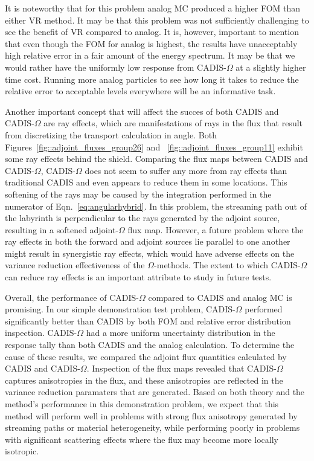 \documentclass[12pt]{article}
\begin{document}
It is noteworthy that for this problem analog MC produced a higher FOM than either VR method. 
It may be that this problem was not sufficiently challenging to see the benefit of VR compared to analog. 
It is, however, important to mention that even though the FOM for analog is highest, the results have unacceptably high relative error in a fair amount of the energy spectrum. 
It may be that we would rather have the uniformly low response from CADIS-$\Omega$ at a slightly higher time cost.
Running more analog particles to see how long it takes to reduce the relative error to acceptable levels everywhere will be an informative task. 

Another important concept that will affect the succes of both CADIS and CADIS-$\Omega$ are ray effects, which are manifestations of rays in the flux that result from discretizing the transport calculation in angle. Both Figures~\ref{fig::adjoint_fluxes_group26} and ~\ref{fig::adjoint_fluxes_group11} exhibit some ray effects behind the shield. Comparing the flux maps between CADIS and  CADIS-$\Omega$, CADIS-$\Omega$ does not seem to suffer any more from ray effects than traditional CADIS and even appears to reduce them in some locations. This softening of the rays may be caused by the integration performed in the numerator of Eqn.~\eqref{eq:angularhybrid}. In this problem, the streaming path out of the labyrinth is perpendicular to the rays generated by the adjoint source, resulting in a softened adjoint-$\Omega$ flux map. However, a future problem where the ray effects in both the forward and adjoint sources lie parallel to one another might result in synergistic ray effects, which would have adverse effects on the variance reduction effectiveness of the $\Omega$-methods. The extent to which CADIS-$\Omega$ can reduce ray effects is an important attribute to study in future tests.

Overall, the performance of CADIS-$\Omega$ compared to CADIS and analog MC is promising. In our simple demonstration test problem, CADIS-$\Omega$ performed significantly better than CADIS by both FOM and relative error distribution inspection. CADIS-$\Omega$ had a more uniform uncertainty distribution in the response tally than both CADIS and the analog calculation. To determine the cause of these results, we compared the adjoint flux quantities calculated by CADIS and CADIS-$\Omega$. Inspection of the flux maps revealed that CADIS-$\Omega$ captures anisotropies in the flux, and these anisotropies are reflected in the variance reduction paramaters that are generated. Based on both theory and the method's performance in this demonstration problem, we expect that this method will perform well in problems with strong flux anisotropy generated by streaming paths or material heterogeneity, while performing poorly in problems with significant scattering effects where the flux may become more locally isotropic. 
 
\end{document}
